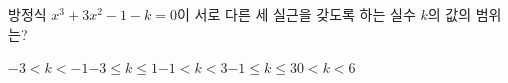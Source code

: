 방정식 $x^3+3x^2-1-k=0$이 서로 다른 세 실근을 갖도록 하는 실수 $k$의 값의 범위는?
\begin{choicesii}{$-3<k<-1$}{$-3\le k\le 1$}{$-1<k<3$}{$-1\le k\le 3$}{$0<k<6$}\end{choicesii}
